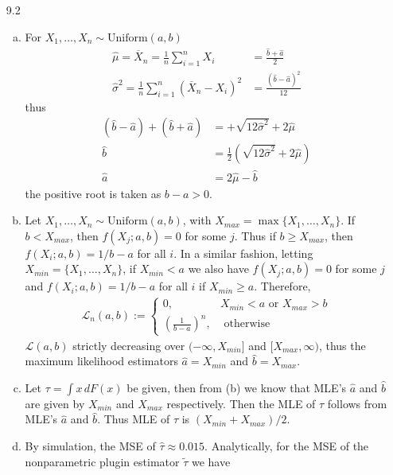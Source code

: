 \documentclass[a4paper,10pt]{article}
\theoremstyle{definition}
\begin{document}
\begin{enumerate}
\item[9.2]
\begin{enumerate}[(a)]
\item For $X_1,\ldots, X_n \sim \text{Uniform}(a,b)$
\begin{align*}
\hat{\mu}=\overline{X}_n=\frac{1}{n}\sum_{i=1}^{n}X_i&=\frac{\hat{b}+\hat{a}}{2}\\
\hat{\sigma}^2=\frac{1}{n}\sum_{i=1}^{n}(\overline{X}_n-X_i)^2&=\frac{(\hat{b}-\hat{a})^2}{12}
\end{align*}
thus
\begin{align*}
(\hat{b}-\hat{a})+(\hat{b}+\hat{a}) &= +\sqrt{12\hat{\sigma}^2}+2\hat{\mu}\\
\hat{b} &= \frac{1}{2}\left(\sqrt{12\hat{\sigma}^2}+2\hat{\mu}\right)\\
\hat{a} &=2\hat{\mu}-\hat{b }
\end{align*}
the positive root is taken as $b-a>0$.
\item Let $X_1,\ldots, X_n \sim \text{Uniform}(a,b)$, with $X_{max}=\max \{X_1,\ldots, X_n\}$. If $b < X_{max}$, then $f(X_j;a,b)=0$ for some $j$. Thus if $b \geq X_{max}$, then $f(X_i;a,b)=1/b-a$ for all $i$. In a similar fashion, letting $X_{min} = \{X_1,\ldots, X_n\}$, if $X_{min}<a$ we also have $f(X_j;a,b)=0$ for some $j$ and $f(X_i;a,b)=1/b-a$ for all $i$ if $X_{min} \geq a$. Therefore,
\begin{align*}
\mathcal{L}_n(a,b):=\begin{cases}
0, & X_{min} < a \text{ or }X_{max} >  b \\
\left(\frac{1}{b-a}\right)^n, & \text{ otherwise }%
\end{cases}
\end{align*}
$\mathcal{L}(a,b)$ strictly decreasing over $(-\infty,X_{min}]$ and $[X_{max},\infty)$, thus the maximum likelihood estimators $\hat{a}=X_{min}$ and $\hat{b}=X_{max}$.

\item Let $\tau = \int x \,dF(x)$ be given, then from (b) we know that {\sffamily MLE}'s $\hat{a}$ and $\hat{b}$ are given by $X_{min}$ and $X_{max}$ respectively. Then the {\sffamily MLE} of $\tau$ follows from {\sffamily MLE}'s $\hat{a}$ and $\hat{b}$. Thus {\sffamily MLE} of $\tau$ is $(X_{min} + X_{max})/2$. 
\item By simulation, the {\sffamily MSE} of $\hat{\tau} \approx 0.015$. Analytically, for the {\sffamily MSE} of the  nonparametric plugin estimator $\tilde{\tau}$ we have


\end{enumerate}
\end{enumerate}
\end{document}
